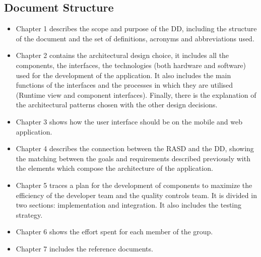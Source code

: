 \subsection{Document Structure}
\begin{itemize}
	\item Chapter 1 describes the scope and purpose of the DD, including the structure of the document and the set of definitions, acronyms and abbreviations used.
	\item Chapter 2 contains the architectural design choice, it includes all the components, the interfaces, the technologies (both hardware and software) used for the development of the application. It also includes the main functions of the interfaces and the processes in which they are utilised (Runtime view and component interfaces). Finally, there is the explanation of the architectural patterns chosen with the other design decisions.
	\item Chapter 3 shows how the user interface should be on the mobile and web application.
	\item Chapter 4 describes the connection between the RASD and the DD, showing the matching between the goals and requirements described previously with the elements which compose the
architecture of the application.
	\item Chapter 5 traces a plan for the development of components to maximize the efficiency of the developer team and the quality controls team. It is divided in two sections: implementation and integration. It also includes the testing strategy.
	\item Chapter 6 shows the effort spent for each member of the group.
	\item Chapter 7 includes the reference documents.
\end{itemize}
